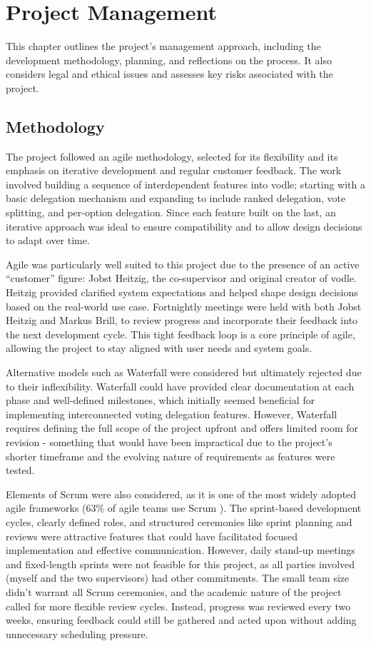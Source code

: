 \chapter{Project Management}

This chapter outlines the project's management approach, including the development methodology, planning, and reflections on the process. It also considers legal and ethical issues and assesses key risks associated with the project.

\section{Methodology}
The project followed an agile methodology, selected for its flexibility and its emphasis on iterative development and regular customer feedback. The work involved building a sequence of interdependent features into vodle; starting with a basic delegation mechanism and expanding to include ranked delegation, vote splitting, and per-option delegation. Since each feature built on the last, an iterative approach was ideal to ensure compatibility and to allow design decisions to adapt over time.

Agile was particularly well suited to this project due to the presence of an active ``customer'' figure: Jobst Heitzig, the co-supervisor and original creator of vodle. Heitzig provided clarified system expectations and helped shape design decisions based on the real-world use case. Fortnightly meetings were held with both Jobst Heitzig and Markus Brill, to review progress and incorporate their feedback into the next development cycle. This tight feedback loop is a core principle of agile, allowing the project to stay aligned with user needs and system goals.

Alternative models such as Waterfall were considered but ultimately rejected due to their inflexibility. Waterfall could have provided clear documentation at each phase and well-defined milestones, which initially seemed beneficial for implementing interconnected voting delegation features. However, Waterfall requires defining the full scope of the project upfront and offers limited room for revision - something that would have been impractical due to the project's shorter timeframe and the evolving nature of requirements as features were tested.

Elements of Scrum were also considered, as it is one of the most widely adopted agile frameworks (63\% of agile teams use Scrum \citep{versionone2020stateofagile}). The sprint-based development cycles, clearly defined roles, and structured ceremonies like sprint planning and reviews were attractive features that could have facilitated focused implementation and effective communication. However, daily stand-up meetings and fixed-length sprints were not feasible for this project, as all parties involved (myself and the two supervisors) had other commitments. The small team size didn't warrant all Scrum ceremonies, and the academic nature of the project called for more flexible review cycles. Instead, progress was reviewed every two weeks, ensuring feedback could still be gathered and acted upon without adding unnecessary scheduling pressure.

